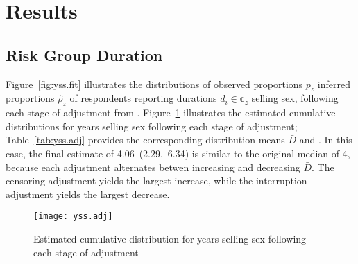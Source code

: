 \section{Results}
\subsection{Risk Group Duration}\label{res.yss}
Figure~\ref{fig:yss.fit} illustrates the distributions of
observed proportions $p_z$ \vs inferred proportions $\hat{\rho}_z$ of respondents
reporting durations $d_i \in \mathbb{d}_z$ selling sex,
following each stage of adjustment from .
Figure~\ref{fig:yss.adj} illustrates
the estimated cumulative distributions for years selling sex following each stage of adjustment;
Table~\ref{tab:yss.adj} provides the corresponding distribution means $\bar{D}$ and \ci.
In this case, the final estimate of 4.06~(2.29,~6.34) is similar to the original median of 4,
because each adjustment alternates betwen increasing and decreasing $\bar{D}$.
The censoring adjustment yields the largest increase, while
the interruption adjustment yields the largest decrease.
\begin{figure}[h]
  \centering\texttt{[image: yss.adj]}
  \caption{Estimated cumulative distribution for years selling sex
    following each stage of adjustment}
  \label{fig:yss.adj}
\end{figure}
